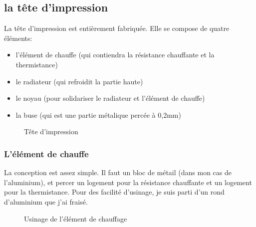 \subsection{la tête d'impression}
La tête d'impression est entièrement fabriquée. Elle se compose de quatre éléments:%
\begin{itemize}%
\item{l'élément de chauffe (qui contiendra la résistance chauffante et la thermistance)}%
\item{le radiateur (qui refroidit la partie haute)}%
\item{le noyau (pour solidariser le radiateur et l'élément de chauffe)}%
\item{la buse (qui est une partie métalique percée à 0,2mm)}%
\end{itemize}%
\begin{figure}%
   \caption{\label{tete_impression} Tête d'impression}%
\end{figure}%
\subsubsection{L'élément de chauffe}%
La conception est assez simple. Il faut un bloc de métail (dans mon cas de l'aluminium), et%
percer un logement pour la résistance chauffante et un logement pour la thermistance.%
Pour des facilité d'usinage, je suis parti d'un rond d'aluminium que j'ai fraisé.
\begin{figure}%
   \caption{\label{usinage_chauffe} Usinage de l'élément de chauffage}%
\end{figure}%
